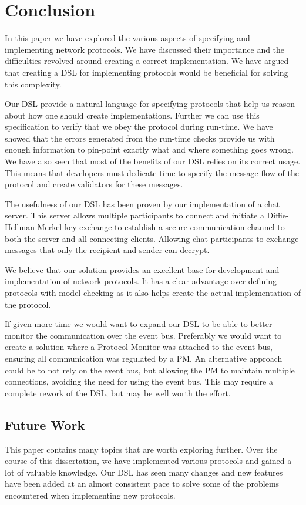 \section{Conclusion}
In this paper we have explored the various aspects of specifying and implementing network protocols. We have discussed their importance and the difficulties revolved around creating a correct implementation. We have argued that creating a DSL for implementing protocols would be beneficial for solving this complexity.

Our DSL provide a natural language for specifying protocols that help us reason about how one should create implementations. Further we can use this specification to verify that we obey the protocol during run-time. We have showed that the errors generated from the run-time checks provide us with enough information to pin-point exactly what and where something goes wrong. We have also seen that most of the benefits of our DSL relies on its correct usage. This means that developers must dedicate time to specify the message flow of the protocol and create validators for these messages.

The usefulness of our DSL has been proven by our implementation of a chat server. This server allows multiple participants to connect and initiate a Diffie-Hellman-Merkel key exchange to establish a secure communication channel to both the server and all connecting clients. Allowing chat participants to exchange messages that only the recipient and sender can decrypt.

We believe that our solution provides an excellent base for development and implementation of network protocols. It has a clear advantage over defining protocols with model checking as it also helps create the actual implementation of the protocol.   

If given more time we would want to expand our DSL to be able to better monitor the communication over the event bus. Preferably we would want to create a solution where a Protocol Monitor was attached to the event bus, ensuring all communication was regulated by a PM. An alternative approach could be to not rely on the event bus, but allowing the PM to maintain multiple connections, avoiding the need for using the event bus. This may require a complete rework of the DSL, but may be well worth the effort.


\subsection{Future Work}
This paper contains many topics that are worth exploring further. Over the course of this dissertation, we have implemented various protocols and gained a lot of valuable knowledge. Our DSL has seen many changes and new features have been added at an almost consistent pace to solve some of the problems encountered when implementing new protocols.

